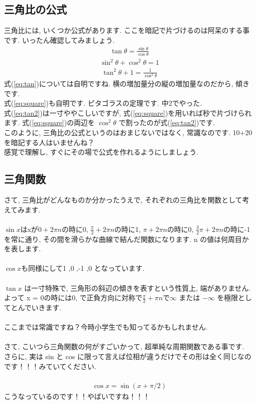 \documentclass[11pt,a4paper]{jreport}
\begin{document}
\subsection{三角比の公式}
三角比には, いくつか公式があります. ここを暗記で片づけるのは阿呆のする事です. いったん確認してみましょう.
\begin{eqnarray}
\tan \theta = \frac{\sin\theta}{\cos\theta}
\label{eq:tan}
\end{eqnarray}
\begin{eqnarray}
\sin^2 \theta + \cos^2\theta = 1
\label{eq:square}
\end{eqnarray}
\begin{eqnarray}
\tan^2\theta + 1 = \frac{1}{\cos^2\theta}
\label{eq:tan2}
\end{eqnarray}
式(\ref{eq:tan})については自明ですね. 横の増加量分の縦の増加量なのだから, 傾きです.\\
式(\ref{eq:square})も自明です. ピタゴラスの定理です. 中2でやった. \\
式(\ref{eq:tan2})は一寸ややこしいですが, 式(\ref{eq:square})を用いれば秒で片づけられます. 式(\ref{eq:square})の両辺を $\cos^2\theta$ で割ったのが式(\ref{eq:tan2})です.\\
このように, 三角比の公式というのはおまじないではなく, 常識なのです. 10+20を暗記する人はいませんね？\\
感覚で理解し, すぐにその場で公式を作れるようにしましょう. 



\subsection{三角関数}
さて, 三角比がどんなものか分かったうえで, それぞれの三角比を関数として考えてみます.\\
\\
 $\sin x $はxが$0 + 2\pi n$の時に0, $\frac{\pi}{2} + 2\pi n$の時に1, $\pi + 2\pi n$の時に0, $\frac{3}{2}\pi + 2\pi n$の時に-1を常に通り, その間を滑らかな曲線で結んだ関数になります. n の値は何周目かを表します.\\
\\
$\cos x $も同様にして1 ,0 ,-1 ,0 となっています. \\
\\
$\tan x$ は一寸特殊で, 三角形の斜辺の傾きを表すという性質上, 端がありません. よって x = 0の時には0, で正負方向に対称で$\frac{\pi}{2} + \pi n$で$\infty$ または $-\infty$ を極限としてとんでいきます.\\
\\
ここまでは常識ですね？今時小学生でも知ってるかもしれません.\\
\\
さて, こいつら三角関数の何がすごいかって, 超単純な周期関数である事です. \\
さらに, 実は sin と cos に限って言えば位相が違うだけでその形は全く同じなのです！！！みていてください.\\
\\
\begin{eqnarray}
\cos x = \sin (x + \pi/2)
\end{eqnarray}
こうなっているのです！！やばいですね！！！
\\
\end{document}
